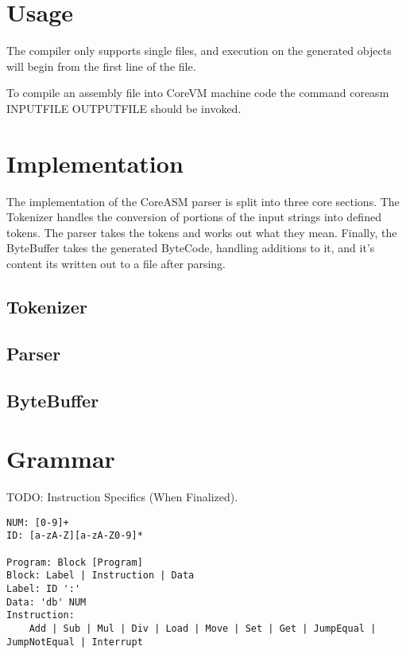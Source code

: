 \documentclass{article}
\begin{document}
\section* {Usage}

The compiler only supports single files, and execution on the generated objects will begin from the first line of the file.

To compile an assembly file into CoreVM machine code the command coreasm INPUTFILE OUTPUTFILE should be invoked.

\section* {Implementation}

The implementation of the CoreASM parser is split into three core sections. The Tokenizer handles the conversion of portions of the input strings into defined tokens.
The parser takes the tokens and works out what they mean. Finally, the ByteBuffer takes the generated ByteCode, handling additions to it, and it's content its written
out to a file after parsing.

\subsection* {Tokenizer}
\subsection* {Parser}
\subsection* {ByteBuffer}

\section* {Grammar}
TODO: Instruction Specifics (When Finalized).
\begin{verbatim}
NUM: [0-9]+
ID: [a-zA-Z][a-zA-Z0-9]*

Program: Block [Program]
Block: Label | Instruction | Data
Label: ID ':'
Data: 'db' NUM
Instruction:
	Add | Sub | Mul | Div | Load | Move | Set | Get | JumpEqual | JumpNotEqual | Interrupt
\end{verbatim}
\end{document}
